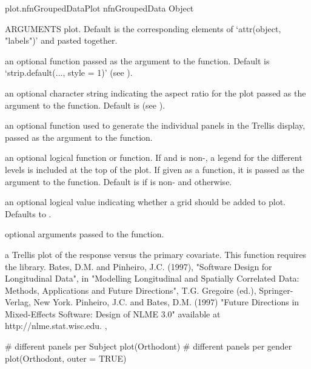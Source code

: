 \documentclass[pdftex]{article} \usepackage{url,graphicx}
\begin{document}
\begin{Helpfile}{plot.nfnGroupedData}{Plot nfnGroupedData Object}
\begin{Argument}{ARGUMENTS}
plot. Default is the corresponding elements of `attr(object,
     "labels")' and  pasted together.
\item[\Co{strip:}]
an optional function passed as the  argument to
the  function. Default is `strip.default(..., style
     = 1)' (see ).
\item[\Co{aspect:}]
an optional character string indicating the aspect ratio
for the plot passed as the  argument to the
 function. Default is  (see
). 
\item[\Co{panel:}]
an optional function used to generate the individual
panels in the Trellis display, passed as the  argument
to the  function.
\item[\Co{key:}]
an optional logical function or function. If 
and  is non-, a legend for the
different  levels is included at the top of the
plot. If given as a function, it is passed as the  argument
to the  function.  Default is  if
 is non- and  otherwise.
\item[\Co{grid:}]
an optional logical value indicating whether a grid should
be added to plot. Defaults to .
\item[\Co{...:}]
optional arguments passed to the  function.
\end{Argument}
a Trellis plot of the response versus the primary covariate.
 This function requires the  library.
Bates, D.M. and Pinheiro, J.C. (1997), "Software Design for Longitudinal
Data", in "Modelling Longitudinal and Spatially Correlated Data:
Methods, Applications and Future Directions", T.G. Gregoire (ed.),
Springer-Verlag, New York.
Pinheiro, J.C. and Bates, D.M. (1997) "Future Directions in
Mixed-Effects Software: Design of NLME 3.0" available at
http://nlme.stat.wisc.edu.
, 
\need 15pt
\vspace{-16pt} 
\begin{Example}
# different panels per Subject
plot(Orthodont)
# different panels per gender
plot(Orthodont, outer = TRUE)
\end{Example}
\end{Helpfile}
\end{document}
